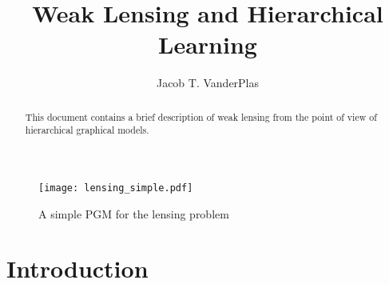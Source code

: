 \documentclass[12pt]{article}
\title{Weak Lensing and Hierarchical Learning}
\author{Jacob T. VanderPlas}
\begin{document}
\maketitle

\begin{abstract}
  This document contains a brief description of weak lensing from the point
  of view of hierarchical graphical models.
\end{abstract}

\begin{figure}[htb]
  \centering
  \texttt{[image: lensing\_simple.pdf]}
  \caption{A simple PGM for the lensing problem}
  \label{fig:PGM_simple}
\end{figure}


\section{Introduction}
\label{sec:intro}
\end{document}
